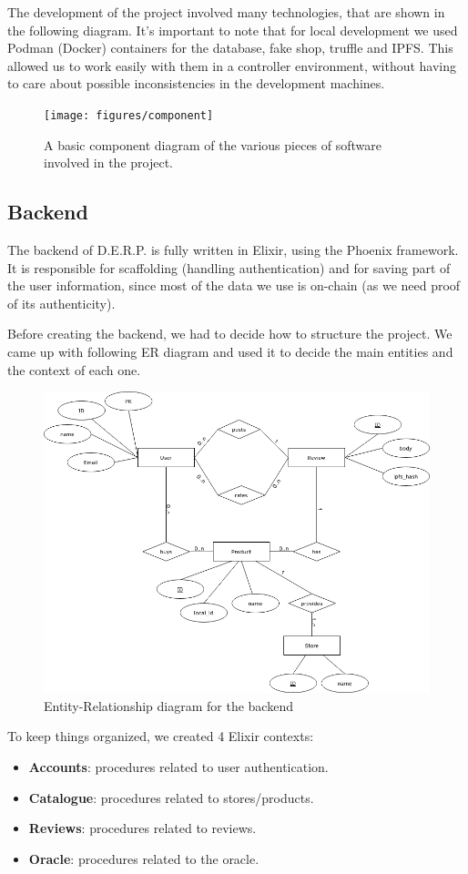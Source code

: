 \documentclass[12pt,a4paper,oneside]{article}
\theoremstyle{definition}
\begin{document}
The development of the project involved many technologies, that are shown in the following diagram.
It's important to note that for local development we used Podman (Docker) containers for the database, fake shop, truffle and IPFS. This allowed us to work easily with them in a controller environment, without having to care about possible inconsistencies in the development machines.

\begin{figure}[H]
	\centering
	\texttt{[image: figures/component]}
	\caption{A basic component diagram of the various pieces of software involved in the project.}
	\label{fig:component}
\end{figure}


\subsection{Backend}

The backend of D.E.R.P. is fully written in Elixir, using the Phoenix framework. It is responsible for scaffolding (handling authentication) and for saving part of the user information, since most of the data we use is on-chain (as we need proof of its authenticity).

Before creating the backend, we had to decide how to structure the project. We came up with following ER diagram and used it to decide the main entities and the context of each one.

\begin{figure}[ht]
	\centering
	\includegraphics[width=0.6\linewidth]{figures/derp_er.drawio.png}
	\caption{Entity-Relationship diagram for the backend}
	\label{fig:er-diagram}
\end{figure}

To keep things organized, we created 4 Elixir contexts:
\begin{itemize}
	\item \textbf{Accounts}: procedures related to user authentication.
	\item \textbf{Catalogue}: procedures related to stores/products.
	\item \textbf{Reviews}: procedures related to reviews.
	\item \textbf{Oracle}: procedures related to the oracle.
\end{itemize}
\end{document}
